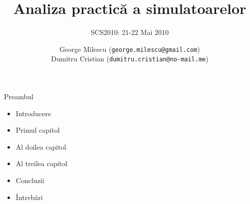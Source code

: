 \documentclass{beamer}
\title[SCS2010]{Analiza practică a simulatoarelor}
\subtitle{SCS2010: 21-22 Mai 2010}
\institute[CS]{Prof. Dr. Ing. Nume Prenume}
\author[A]{George Milescu (\texttt{george.milescu@gmail.com}) \\ 
  Dumitru Cristian (\texttt{dumitru.cristian@no-mail.me})}
\begin{document}
{
  \frame{\titlepage}
}

\begin{frame}{Preambul}
  \begin{itemize}
    \item Introducere
    \item Primul capitol
    \item Al doilea capitol
    \item Al treilea capitol
    \item Concluzii
    \item Întrebări
  \end{itemize}
\end{frame}
\end{document}
